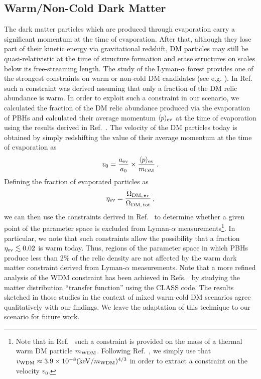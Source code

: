 \documentclass[aps,prd,reprint,twocolumn,preprintnumbers,floatfix,nofootinbib]{revtex4-1}
\newcommand{\be}{\begin{equation}}
\newcommand{\ee}{\end{equation}}
\begin{document}
\subsection{Warm/Non-Cold Dark Matter}
The dark matter particles which are produced through evaporation carry a significant momentum at the time of evaporation. After that, although they lose part of their kinetic energy via gravitational redshift, DM particles may still be quasi-relativistic at the time of structure formation and erase structures on scales below its free-streaming length. The study of the Lyman-$\alpha$ forest provides one of the strongest constraints on warm or non-cold DM candidates (see e.g. \cite{Hui:1996fh,Gnedin:2001wg}). In Ref.~\cite{Boyarsky:2008xj, Baur:2017stq} such a constraint was derived assuming that only a fraction of the DM relic abundance is warm. In order to exploit such a constraint in our scenario, we calculated the fraction of the DM relic abundance produced via the evaporation of PBHs and calculated their average momentum $\langle p\rangle_{\rm ev}$ at the time of evaporation using the results derived in Ref.~\cite{paper1}. The velocity of the DM particles today is obtained by simply redshifting the value of their average momentum at the time of evaporation as
\be
v_{0} = \frac{a_{\rm ev}}{a_0}\times\frac{\langle p\rangle_{\rm ev}}{m_{\rm DM}}\,.
\ee
Defining the fraction of evaporated particles as
\be
\eta_{\rm ev}=\frac{\Omega_{\rm DM,\, ev}}{\Omega_{\rm DM,\, tot}}\,,
\ee
we can then use the constraints derived in Ref.~\cite{Boyarsky:2008xj,Baur:2017stq} to determine whether a given point of the parameter space is excluded from Lyman-$\alpha$ measurements\footnote{Note that in Ref.~\cite{Baur:2017stq} such a constraint is provided on the mass of a thermal warm DM particle $m_{\rm WDM}$. Following Ref.~\cite{Baldes:2020nuv}, we simply use that $v_{\rm WDM}\approx 3.9\times 10^{-8}(\mathrm{keV}/m_{\rm WDM})^{4/3}$ in order to extract a constraint on the velocity $v_0$.}. In particular, we note that such constraints allow the possibility that a fraction $\eta_{\rm ev}\lesssim 0.02$ is warm today. Thus, regions of the parameter space in which PBHs produce less than 2\% of the relic density are not affected by the warm dark matter constraint derived from Lyman-$\alpha$ measurements. {Note that a more refined analysis of the WDM constraint has been achieved in Refs.~\cite{Baldes:2020nuv, Auffinger:2020afu} by studying the matter distribution “transfer
function” using the \textsf{CLASS} code. The results sketched in those studies in the context of mixed warm-cold DM scenarios agree qualitatively with our findings. We leave the adaptation of this technique to our scenario for future work.}
\end{document}
